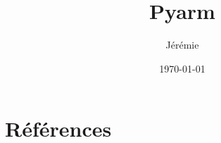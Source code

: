 \documentclass[pdftex,a4paper,11pt]{article}
\begin{document}
\title{Pyarm}
\author{
	Jérémie 
}
\date{\today{}}

\maketitle


\section*{Références}

\cite{
kambara2009,
mitrovic2010adaptive,
mitrovic2010optimal,
mitrovic2009,
mitrovic2008,
katayama1993,
brown1999,
li2006,
todorov2003optimal,
li2004,
todorov2005,
ozkaya1999,
kapandji2008,
feldman1966functional,
hogan1984organizing,
rack1969effects,
mussa1985neural,
bennett1991relationship,
bennett1992time,
gomi1992human,
katayama1990learning,
hogan1985mechanics,
flash1990human,
katayama1991virtual,
morasso1981spatial,
hatze1979model,
hatze1980mathematical,
amis1979muscle,
pigeon1996moment,
wood1989Aquantitation,
wood1989Bquantitation,
engin1987biomechanics,
hogfors1987biomechanical,
guigon2007coding,
guigon2008optimality,
guigon-computational,
marin-apprentissage,
zajac1989muscle,
lacquaniti1982mechanical,
mackay1986measurements,
joyce1969mechanical,
houk1981neural,
salaun2009two,
libeau2009transfer,
sigaud-model}



\end{document}

